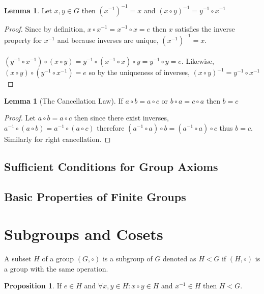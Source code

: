 \documentclass[12pt]{extarticle}
\renewcommand\qedsymbol{$\square$}
\theoremstyle{definition}
\newtheorem{lemma}[theorem]{Lemma}
\newtheorem{proposition}[theorem]{Proposition}
\newenvironment{definition}[1][Definition:]{\begin{trivlist}
\item[\hskip \labelsep {\bfseries #1}]}{\end{trivlist}}
\newenvironment{lproof}{\begin{proof} \renewcommand{\qedsymbol}{}}{\end{proof}}
\begin{document}
\begin{lemma}
Let $x,y \in G$ then $(x^{-1})^{-1} = x$ and $(x \circ y)^{-1} = y^{-1} \circ x^{-1}$
\end{lemma}

\begin{lproof}
Since by definition, $x \circ x^{-1} = x^{-1} \circ x = e$ then $x$ satisfies the inverse property for $x^{-1}$ and because inverses are unique, $(x^{-1})^{-1} = x$. \\\\ $(y^{-1} \circ x^{-1}) \circ (x \circ y) = y^{-1} \circ (x^{-1} \circ x) \circ y = y^{-1} \circ y = e$. Likewise, $(x \circ y) \circ (y^{-1} \circ x^{-1}) = e$  so by the uniqueness of inverses, $(x \circ y)^{-1} = y^{-1} \circ x^{-1}$
\end{lproof}

\begin{lemma}[The Cancellation Law]
If $a \circ b = a \circ c$ or $b \circ a = c \circ a$ then $b = c$
\end{lemma}

\begin{lproof}
Let $a \circ b = a \circ c$ then since there exist inverses, $a^{-1} \circ (a \circ b) = a^{-1} \circ (a \circ c)$ therefore $(a^{-1} \circ a) \circ b = (a^{-1} \circ a) \circ c$ thus $b = c$. Similarly for right cancellation.
\end{lproof}

\subsection{Sufficient Conditions for Group Axioms}

\subsection{Basic Properties of Finite Groups}

\section{Subgroups and Cosets}
\begin{definition}
A subset $H$ of a group $(G, \circ)$ is a subgroup of $G$ denoted as $H < G$ if $(H, \circ)$ is a group with the same operation.
\end{definition}

\begin{proposition}
If $e \in H$ and $\forall x,y \in H : x \circ y \in H$ and $x^{-1} \in H$ then $H < G$.
\end{proposition}
\end{document}
